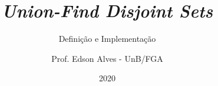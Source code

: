 \title{\it Union-Find Disjoint Sets}
\subtitle{Definição e Implementação}
\author{Prof. Edson Alves - UnB/FGA}
\date{2020}

